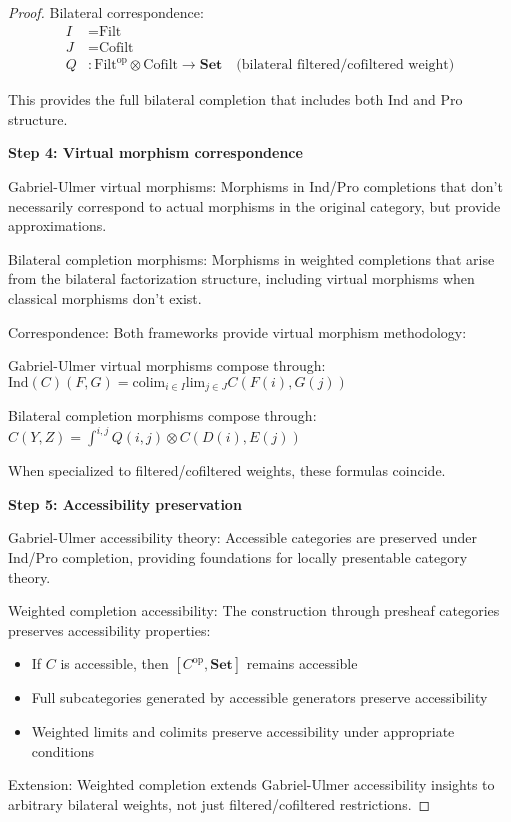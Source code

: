 \documentclass[11pt]{article}
\theoremstyle{plain}
\theoremstyle{definition}
\theoremstyle{remark}
\newcommand{\op}{\mathrm{op}}
\newcommand{\colim}{\mathrm{colim}}
\renewcommand{\lim}{\mathrm{lim}}
\newcommand{\wh}[1]{\widehat{#1}}
\begin{document}
\begin{proof}
Bilateral correspondence:
\begin{align}
I &= \text{Filt} \\
J &= \text{Cofilt} \\
Q &: \text{Filt}^{\op} \otimes \text{Cofilt} \to \mathbf{Set} \quad \text{(bilateral filtered/cofiltered weight)}
\end{align}

This provides the full bilateral completion that includes both Ind and Pro structure.

\textbf{Step 4: Virtual morphism correspondence}

Gabriel-Ulmer virtual morphisms: Morphisms in Ind/Pro completions that don't necessarily correspond to actual morphisms in the original category, but provide approximations.

Bilateral completion morphisms: Morphisms in weighted completions that arise from the bilateral factorization structure, including virtual morphisms when classical morphisms don't exist.

Correspondence: Both frameworks provide virtual morphism methodology:

Gabriel-Ulmer virtual morphisms compose through:
$\text{Ind}(C)(F, G) = \colim_{i \in I} \lim_{j \in J} C(F(i), G(j))$

Bilateral completion morphisms compose through:
$\wh{C}(Y, Z) = \int^{i,j} Q(i,j) \otimes C(D(i), E(j))$

When specialized to filtered/cofiltered weights, these formulas coincide.

\textbf{Step 5: Accessibility preservation}

Gabriel-Ulmer accessibility theory: Accessible categories are preserved under Ind/Pro completion, providing foundations for locally presentable category theory.

Weighted completion accessibility: The construction through presheaf categories preserves accessibility properties:
\begin{itemize}
\item If $C$ is accessible, then $[C^{\op}, \mathbf{Set}]$ remains accessible
\item Full subcategories generated by accessible generators preserve accessibility
\item Weighted limits and colimits preserve accessibility under appropriate conditions
\end{itemize}

Extension: Weighted completion extends Gabriel-Ulmer accessibility insights to arbitrary bilateral weights, not just filtered/cofiltered restrictions.


\end{proof}
\end{document}
